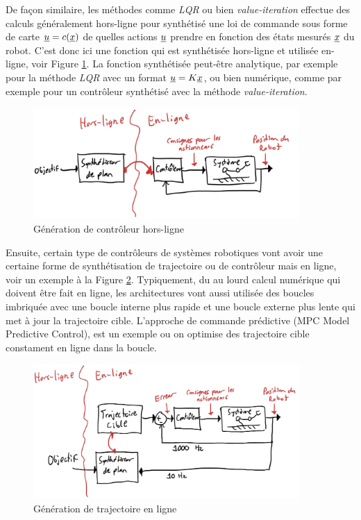 De façon similaire, les méthodes comme \textit{LQR} ou bien \textit{value-iteration} effectue des calculs généralement hors-ligne pour synthétisé une loi de commande sous forme de carte $\underline{u} = c(\underline{x})$ de quelles actions $\underline{u}$ prendre en fonction des états mesurés $\underline{x}$ du robot. C'est donc ici une fonction qui est synthétisée hors-ligne et utilisée en-ligne, voir Figure \ref{fig:offlinecontrollergeneration}. La fonction synthétisée peut-être analytique, par exemple pour la méthode \textit{LQR} avec un format $\underline{u} = K \underline{x}$, ou bien numérique, comme par exemple pour un contrôleur synthétisé avec la méthode \textit{value-iteration}. 
\begin{figure}[htbp]
	\centering
		\includegraphics[width=0.9\textwidth]{fig/offlinecontrollergeneration.jpg}
	\caption{Génération de contrôleur hors-ligne}
	\label{fig:offlinecontrollergeneration}
\end{figure}

Ensuite, certain type de contrôleurs de systèmes robotiques vont avoir une certaine forme de synthétisation de trajectoire ou de contrôleur mais en ligne, voir un exemple à la Figure \ref{fig:onlinetrajectorygeneration}. Typiquement, du au lourd calcul numérique qui doivent être fait en ligne, les architectures vont aussi utilisée des boucles imbriquée avec une boucle interne plus rapide et une boucle externe plus lente qui met à jour la trajectoire cible. L'approche de commande prédictive (MPC Model Predictive Control), est un exemple ou on optimise des trajectoire cible constament en ligne dans la boucle. 
\begin{figure}[htbp]
	\centering
		\includegraphics[width=0.9\textwidth]{fig/onlinetrajectorygeneration.jpg}
	\caption{Génération de trajectoire en ligne}
	\label{fig:onlinetrajectorygeneration}
\end{figure}





